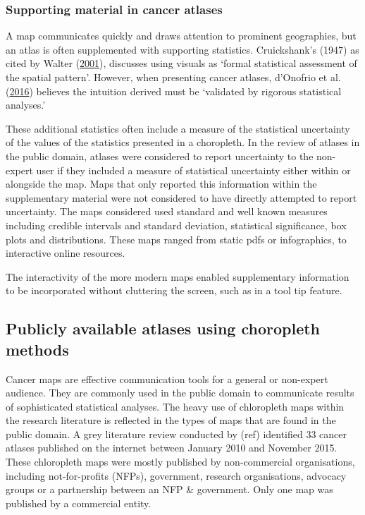 \documentclass[11pt,]{article}
\begin{document}
\hypertarget{supporting-material-in-cancer-atlases}{%
\subsubsection{Supporting material in cancer
atlases}\label{supporting-material-in-cancer-atlases}}

A map communicates quickly and draws attention to prominent geographies,
but an atlas is often supplemented with supporting statistics.
Cruickshank's (1947) as cited by Walter
(\protect\hyperlink{ref-DMAHP}{2001}), discusses using visuals as
`formal statistical assessment of the spatial pattern'. However, when
presenting cancer atlases, d'Onofrio et al.
(\protect\hyperlink{ref-MACM}{2016}) believes the intuition derived must
be `validated by rigorous statistical analyses.'

These additional statistics often include a measure of the statistical
uncertainty of the values of the statistics presented in a choropleth.
In the review of atlases in the public domain, atlases were considered
to report uncertainty to the non-expert user if they included a measure
of statistical uncertainty either within or alongside the map. Maps that
only reported this information within the supplementary material were
not considered to have directly attempted to report uncertainty. The
maps considered used standard and well known measures including credible
intervals and standard deviation, statistical significance, box plots
and distributions. These maps ranged from static pdfs or infographics,
to interactive online resources.

The interactivity of the more modern maps enabled supplementary
information to be incorporated without cluttering the screen, such as in
a tool tip feature.

\hypertarget{publicly-available-atlases-using-choropleth-methods}{%
\subsection{Publicly available atlases using choropleth
methods}\label{publicly-available-atlases-using-choropleth-methods}}

Cancer maps are effective communication tools for a general or
non-expert audience. They are commonly used in the public domain to
communicate results of sophisticated statistical analyses. The heavy use
of chloropleth maps within the research literature is reflected in the
types of maps that are found in the public domain. A grey literature
review conducted by (ref) identified 33 cancer atlases published on the
internet between January 2010 and November 2015. These chloropleth maps
were mostly published by non-commercial organisations, including
not-for-profits (NFPs), government, research organisations, advocacy
groups or a partnership between an NFP \& government. Only one map was
published by a commercial entity.
\end{document}
